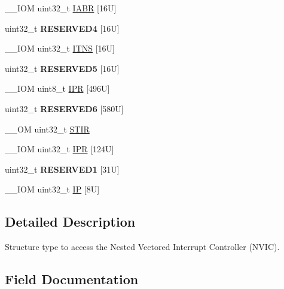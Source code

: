 \begin{DoxyCompactItemize}
\item 
\+\_\+\+\_\+\+I\+OM uint32\+\_\+t \mbox{\hyperlink{struct_n_v_i_c___type_a12dfc70e0aa06804ff91817c6a3c7d6e}{I\+A\+BR}} \mbox{[}16\+U\mbox{]}
\item 
\mbox{\label{struct_n_v_i_c___type_a0701d75c5b133d8d5a4436097a202236}} 
uint32\+\_\+t {\bfseries R\+E\+S\+E\+R\+V\+E\+D4} \mbox{[}16\+U\mbox{]}
\item 
\+\_\+\+\_\+\+I\+OM uint32\+\_\+t \mbox{\hyperlink{struct_n_v_i_c___type_addfcdde1da9ca4b87b4b8068b5df0dda}{I\+T\+NS}} \mbox{[}16\+U\mbox{]}
\item 
\mbox{\label{struct_n_v_i_c___type_abd5ef8d9e3caace25094ac684840b270}} 
uint32\+\_\+t {\bfseries R\+E\+S\+E\+R\+V\+E\+D5} \mbox{[}16\+U\mbox{]}
\item 
\+\_\+\+\_\+\+I\+OM uint8\+\_\+t \mbox{\hyperlink{struct_n_v_i_c___type_a05eb0e8297dff88c314d42ab3d91320f}{I\+PR}} \mbox{[}496\+U\mbox{]}
\item 
\mbox{\label{struct_n_v_i_c___type_a438158c308a5c50a2d80c21adb72228d}} 
uint32\+\_\+t {\bfseries R\+E\+S\+E\+R\+V\+E\+D6} \mbox{[}580\+U\mbox{]}
\item 
\+\_\+\+\_\+\+OM uint32\+\_\+t \mbox{\hyperlink{struct_n_v_i_c___type_ada9cbba14ab1cc3fddd585f870932db8}{S\+T\+IR}}
\item 
\+\_\+\+\_\+\+I\+OM uint32\+\_\+t \mbox{\hyperlink{struct_n_v_i_c___type_a5a3763fa8e079c90b6a8e09c0587eef4}{I\+PR}} \mbox{[}124\+U\mbox{]}
\item 
\mbox{\label{struct_n_v_i_c___type_add46a071831a633ae4dd040bb35484b3}} 
uint32\+\_\+t {\bfseries R\+E\+S\+E\+R\+V\+E\+D1} \mbox{[}31\+U\mbox{]}
\item 
\+\_\+\+\_\+\+I\+OM uint32\+\_\+t \mbox{\hyperlink{struct_n_v_i_c___type_a54051f32091607a64e1e044413da3b8b}{IP}} \mbox{[}8\+U\mbox{]}
\end{DoxyCompactItemize}


\subsection{Detailed Description}
Structure type to access the Nested Vectored Interrupt Controller (N\+V\+IC). 

\subsection{Field Documentation}
\mbox{\label{struct_n_v_i_c___type_a12dfc70e0aa06804ff91817c6a3c7d6e}} 
